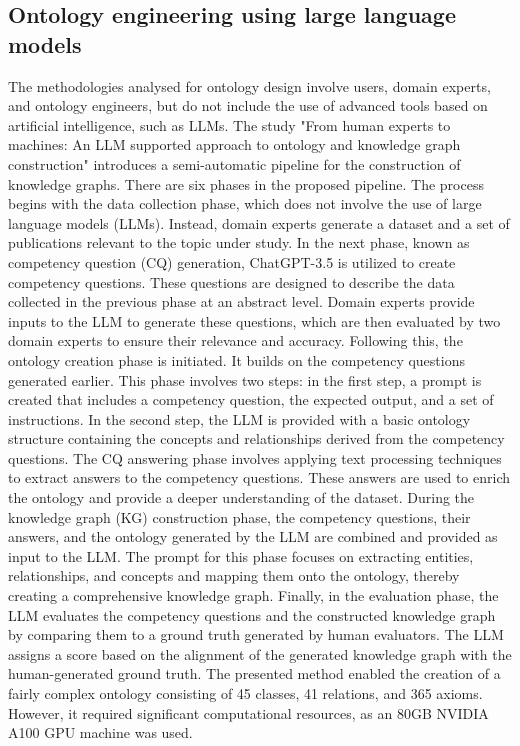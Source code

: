 \subsection{Ontology engineering using large language models}
The methodologies analysed for ontology design involve users, domain experts, and ontology engineers, but do not include the use of advanced tools based on artificial intelligence, such as LLMs. The study "From human experts to machines: An LLM supported approach to ontology and knowledge graph construction"\cite{kommineni2024human} introduces a semi-automatic pipeline for the construction of knowledge graphs. There are six phases in the proposed pipeline.
The process begins with the data collection phase, which does not involve the use of large language models (LLMs). Instead, domain experts generate a dataset and a set of publications relevant to the topic under study.
In the next phase, known as competency question (CQ) generation, ChatGPT-3.5 is utilized to create competency questions. These questions are designed to describe the data collected in the previous phase at an abstract level. Domain experts provide inputs to the LLM to generate these questions, which are then evaluated by two domain experts to ensure their relevance and accuracy. Following this, the ontology creation phase is initiated. It builds on the competency questions generated earlier. This phase involves two steps: in the first step, a prompt is created that includes a competency question, the expected output, and a set of instructions. In the second step, the LLM is provided with a basic ontology structure containing the concepts and relationships derived from the competency questions.
The CQ answering phase involves applying text processing techniques to extract answers to the competency questions. These answers are used to enrich the ontology and provide a deeper understanding of the dataset.
During the knowledge graph (KG) construction phase, the competency questions, their answers, and the ontology generated by the LLM are combined and provided as input to the LLM. The prompt for this phase focuses on extracting entities, relationships, and concepts and mapping them onto the ontology, thereby creating a comprehensive knowledge graph.
Finally, in the evaluation phase, the LLM evaluates the competency questions and the constructed knowledge graph by comparing them to a ground truth generated by human evaluators. The LLM assigns a score based on the alignment of the generated knowledge graph with the human-generated ground truth.
The presented method enabled the creation of a fairly complex ontology consisting of 45 classes, 41 relations, and 365 axioms. However, it required significant computational resources, as an 80GB NVIDIA A100 GPU machine was used. \\
